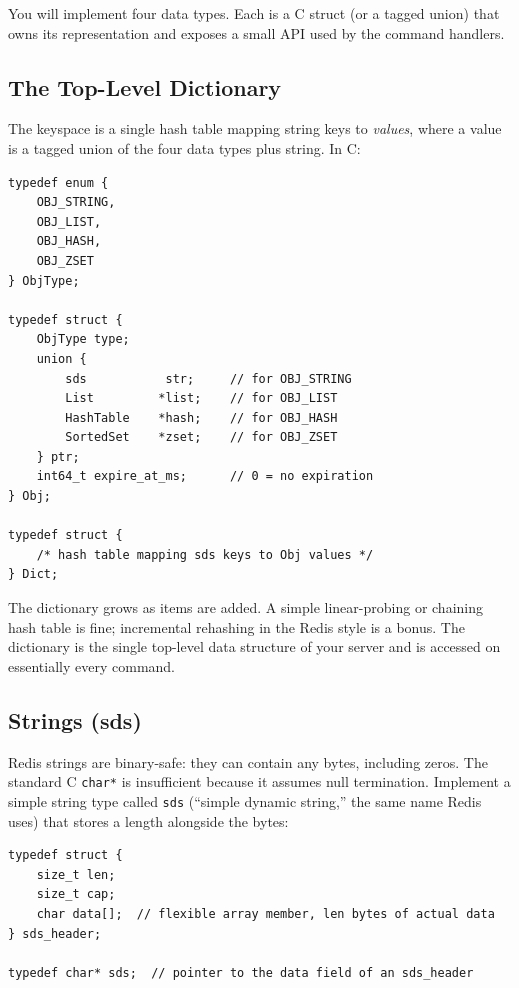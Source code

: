 \documentclass[11pt,a4paper]{article}
\begin{document}
You will implement four data types. Each is a C struct (or a tagged union) that owns its representation and exposes a small API used by the command handlers.

\subsection{The Top-Level Dictionary}
The keyspace is a single hash table mapping string keys to \textit{values}, where a value is a tagged union of the four data types plus string. In C:

\begin{codebox}
\begin{lstlisting}
typedef enum {
    OBJ_STRING,
    OBJ_LIST,
    OBJ_HASH,
    OBJ_ZSET
} ObjType;

typedef struct {
    ObjType type;
    union {
        sds           str;     // for OBJ_STRING
        List         *list;    // for OBJ_LIST
        HashTable    *hash;    // for OBJ_HASH
        SortedSet    *zset;    // for OBJ_ZSET
    } ptr;
    int64_t expire_at_ms;      // 0 = no expiration
} Obj;

typedef struct {
    /* hash table mapping sds keys to Obj values */
} Dict;
\end{lstlisting}
\end{codebox}

The dictionary grows as items are added. A simple linear-probing or chaining hash table is fine; incremental rehashing in the Redis style is a bonus. The dictionary is the single top-level data structure of your server and is accessed on essentially every command.

\subsection{Strings (sds)}
Redis strings are binary-safe: they can contain any bytes, including zeros. The standard C \texttt{char*} is insufficient because it assumes null termination. Implement a simple string type called \texttt{sds} (``simple dynamic string,'' the same name Redis uses) that stores a length alongside the bytes:

\begin{codebox}
\begin{lstlisting}
typedef struct {
    size_t len;
    size_t cap;
    char data[];  // flexible array member, len bytes of actual data
} sds_header;

typedef char* sds;  // pointer to the data field of an sds_header
\end{lstlisting}
\end{codebox}
\end{document}
